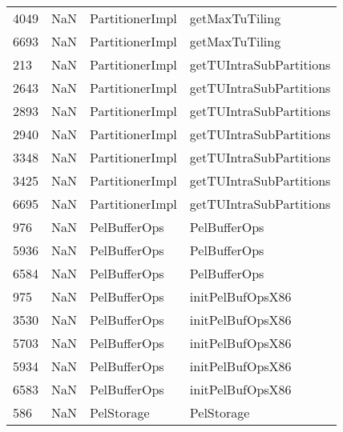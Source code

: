\begin{tabular}{llll}
4049 &                   NaN &            PartitionerImpl &                            getMaxTuTiling \\
6693 &                   NaN &            PartitionerImpl &                            getMaxTuTiling \\
213  &                   NaN &            PartitionerImpl &                   getTUIntraSubPartitions \\
2643 &                   NaN &            PartitionerImpl &                   getTUIntraSubPartitions \\
2893 &                   NaN &            PartitionerImpl &                   getTUIntraSubPartitions \\
2940 &                   NaN &            PartitionerImpl &                   getTUIntraSubPartitions \\
3348 &                   NaN &            PartitionerImpl &                   getTUIntraSubPartitions \\
3425 &                   NaN &            PartitionerImpl &                   getTUIntraSubPartitions \\
6695 &                   NaN &            PartitionerImpl &                   getTUIntraSubPartitions \\
976  &                   NaN &               PelBufferOps &                              PelBufferOps \\
5936 &                   NaN &               PelBufferOps &                              PelBufferOps \\
6584 &                   NaN &               PelBufferOps &                              PelBufferOps \\
975  &                   NaN &               PelBufferOps &                          initPelBufOpsX86 \\
3530 &                   NaN &               PelBufferOps &                          initPelBufOpsX86 \\
5703 &                   NaN &               PelBufferOps &                          initPelBufOpsX86 \\
5934 &                   NaN &               PelBufferOps &                          initPelBufOpsX86 \\
6583 &                   NaN &               PelBufferOps &                          initPelBufOpsX86 \\
586  &                   NaN &                 PelStorage &                                PelStorage \\

\end{tabular}
